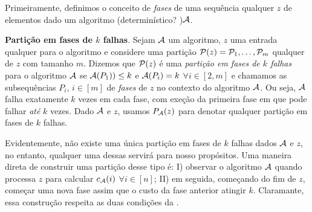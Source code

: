 Primeiramente, definimos o conceito de \emph{fases} de uma sequência qualquer \(z\) de elementos dado um algoritmo (determinístico? )\(\mathcal{A}\).

\begin{definition}
  \label{def:fases}
  \textbf{Partição em fases de \(k\) falhas}. Sejam \(\mathcal{A}\) um algoritmo, \(z\) uma entrada qualquer para o algoritmo e considere uma partição \(\mathcal{P}(z) = \mathcal{P}_1, \dotsc, \mathcal{P}_m\) qualquer de \(z\) com tamanho \(m\). Dizemos que \(\mathcal{P}(z)\) é uma \emph{partição em fases de \(k\) falhas} para o algoritmo \(\mathcal{A}\) se \(\mathcal{A}(P_1)) \le k\) e \(\mathcal{A}(P_i) = k\) \(\forall i \in [2,m]\) e chamamos as subsequências \(P_i\), \(i \in [m]\) de \emph{fases} de \(z\) no contexto do algoritmo \(\mathcal{A}\). Ou seja, \(\mathcal{A}\) falha exatamente \(k\) vezes em cada fase, com exeção da primeira fase em que pode falhar \emph{até} \(k\) vezes. Dado \(\mathcal{A}\) e \(z\), usamos \(P_{\mathcal{A}}(z)\) para denotar qualquer partição em fases de \(k\) falhas.
\end{definition}

Evidentemente, não existe uma única partição em fases de \(k\) falhas dados \(\mathcal{A}\) e \(z\), no entanto, qualquer uma dessas servirá para nosso propósitos. Uma maneira direta de construir uma partição desse tipo é: I) observar o algoritmo \(\mathcal{A}\) quando processa \(z\) para calcular \(c_{\mathcal{A}}(i)\) \(\forall i \in [n]\); II) em seguida, começando do fim de \(z\), começar uma nova fase assim que o custo da fase anterior atingir \(k\). Claramante, essa construção respeita as duas condições da .


